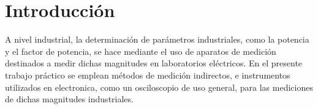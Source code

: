 \section{Introducción}

   A nivel industrial, la determinación de parámetros industriales, como la potencia y el factor
   de potencia, se hace mediante el uso de aparatos de medición destinados a medir dichas 
   magnitudes en laboratorios eléctricos. En el presente trabajo práctico se emplean métodos de
   medición indirectos, e instrumentos utilizados en electronica, como un osciloscopio de uso
   general, para las mediciones de dichas magnitudes industriales.   

